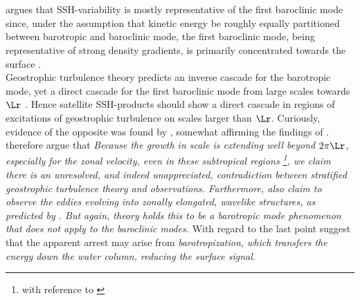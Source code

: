 \section*{\citealt{scott2005direct}}\label{sec:hist_wang}
\cite{wunsch1996ocean} argues that SSH-variability is mostly representative of
the first baroclinic mode since, under the assumption that kinetic energy be
roughly equally partitioned between barotropic and baroclinic mode, the first
baroclinic mode, being representative of strong density gradients, is primarily
concentrated towards the surface \citep{scott2005direct}.\\
Geostrophic turbulence theory predicts an inverse cascade for the barotropic mode, yet a direct cascade for the first baroclinic mode from large scales towards $\Lr$ \citep{vallis2006atmospheric}  . Hence satellite SSH-products should show a direct cascade in regions of excitations of geostrophic turbulence on scales larger than $\Lr$.
Curiously, evidence of the opposite was found by \eg \cite{tapley1994accuracy,Kobashi2002}, somewhat affirming the findings of \cite{larichev1995eddy}. \cite{scott2005direct} therefore argue that \textit{Because the growth in scale is extending well beyond $2\pi\Lr$, especially for the zonal velocity, even in these subtropical regions \footnote{with reference to \cite{Kobashi2002}}, we claim there is an unresolved, and indeed unappreciated, contradiction between stratified geostrophic turbulence theory and observations. Furthermore, \cite{Kobashi2002} also claim to observe the eddies evolving into zonally elongated, wavelike structures, as predicted by \cite{Rhines2006}. But again, theory holds this to be a barotropic mode phenomenon that does not apply to the baroclinic modes.}
With regard to the last point \cite{scott2005direct} suggest that the apparent arrest may arise from \textit{barotropization, which transfers the energy down the water column, reducing the surface signal}. 

